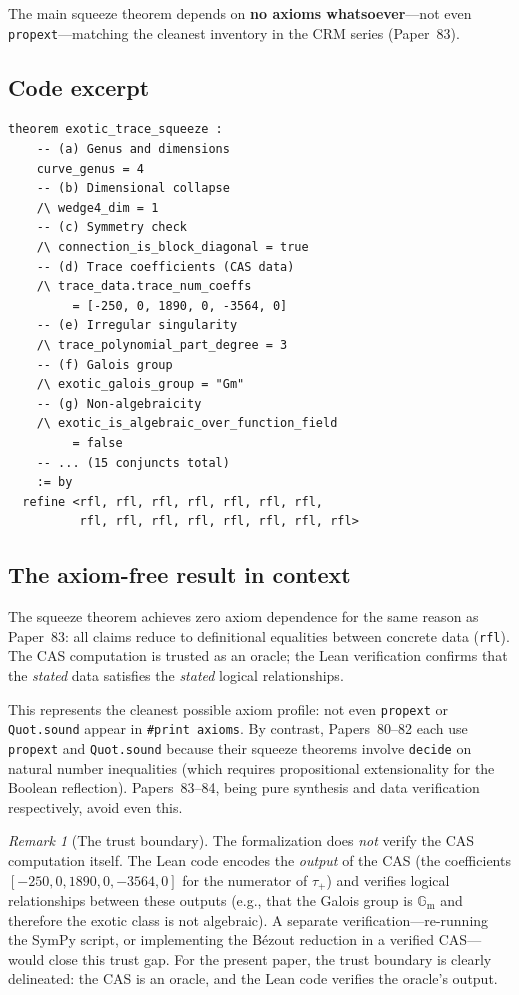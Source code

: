 \documentclass[11pt]{article}
\theoremstyle{plain}
\theoremstyle{definition}
\theoremstyle{remark}
\newtheorem{remark}[theorem]{Remark}
\newcommand{\Gm}{\mathbb{G}_{\mathrm{m}}}
\begin{document}
\medskip\noindent
The main squeeze theorem depends on \textbf{no axioms whatsoever}---not
even \texttt{propext}---matching the cleanest inventory in the CRM series
(Paper~83).

\subsection{Code excerpt}

\begin{lstlisting}
theorem exotic_trace_squeeze :
    -- (a) Genus and dimensions
    curve_genus = 4
    -- (b) Dimensional collapse
    /\ wedge4_dim = 1
    -- (c) Symmetry check
    /\ connection_is_block_diagonal = true
    -- (d) Trace coefficients (CAS data)
    /\ trace_data.trace_num_coeffs
         = [-250, 0, 1890, 0, -3564, 0]
    -- (e) Irregular singularity
    /\ trace_polynomial_part_degree = 3
    -- (f) Galois group
    /\ exotic_galois_group = "Gm"
    -- (g) Non-algebraicity
    /\ exotic_is_algebraic_over_function_field
         = false
    -- ... (15 conjuncts total)
    := by
  refine <rfl, rfl, rfl, rfl, rfl, rfl, rfl,
          rfl, rfl, rfl, rfl, rfl, rfl, rfl, rfl>
\end{lstlisting}

\subsection{The axiom-free result in context}

The squeeze theorem achieves zero axiom dependence for the same reason as
Paper~83: all claims reduce to definitional equalities between concrete data
(\texttt{rfl}). The CAS computation is trusted as an oracle; the Lean
verification confirms that the \emph{stated} data satisfies the \emph{stated}
logical relationships.

This represents the cleanest possible axiom profile: not even \texttt{propext}
or \texttt{Quot.sound} appear in \texttt{\#print axioms}. By contrast,
Papers~80--82 each use \texttt{propext} and \texttt{Quot.sound} because
their squeeze theorems involve \texttt{decide} on natural number inequalities
(which requires propositional extensionality for the Boolean reflection).
Papers~83--84, being pure synthesis and data verification respectively,
avoid even this.

\begin{remark}[The trust boundary]
The formalization does \emph{not} verify the CAS computation itself. The
Lean code encodes the \emph{output} of the CAS (the coefficients
$[-250, 0, 1890, 0, -3564, 0]$ for the numerator of $\tau_+$) and
verifies logical relationships between these outputs (e.g., that the
Galois group is $\Gm$ and therefore the exotic class is not algebraic).
A separate verification---re-running the SymPy script, or implementing
the B\'ezout reduction in a verified CAS---would close this trust gap.
For the present paper, the trust boundary is clearly delineated: the
CAS is an oracle, and the Lean code verifies the oracle's output.
\end{remark}
\end{document}
